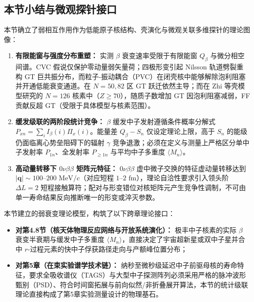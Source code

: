 \subsection{本节小结与微观探针接口}\label{sec:4-7-4}

本节确立了弱相互作用作为低能原子核结构、壳演化与微观关联多维探针的理论图像：
\begin{enumerate}
\item \textbf{有限能窗与强度分布重塑：} 实测 $\beta$ 衰变速率受限于有限能窗 $Q_\beta$ 与微分相空间谱。CVC 假说仅保护零动量弱矢量荷；四极形变引起 Nilsson 轨道劈裂重构 GT 巨共振分布，而粒子-振动耦合（PVC）在闭壳核中能够解除泡利阻塞并开通低能衰变通道。在 $N=50, 82$ 区 GT 跃迁依然主导；而在 Zhi 等壳模型研究的 $N=126$ 核素中（$Z \ge 70$），随质子数增加 GT 因泡利阻塞减弱，FF 贡献反超 GT（受限于具体模型与核素范围）。
\item \textbf{缓发级联的两阶段统计竞争：} $\beta$ 缓发中子发射遵循条件概率分解式 $P_{xn} = \sum_i I_\beta(i) \Pi_x(i)$。能量差 $Q_\beta - S_n$ 仅设定理论上限，高于 $S_n$ 的能级仍面临离心势垒阻碍下的辐射 $\gamma$ 竞争退激；必须在定义与测量上严格区分单中子发射率 $P_{1n}$、全发射率 $P_{\ge 1n}$ 与平均中子多重度 $\langle M_n \rangle$。
\item \textbf{高动量转移下 $0\nu\beta\beta$ 矩阵元特征：} $0\nu\beta\beta$ 虚中微子交换的特征虚动量转移达到 $|\mathbf{q}| \sim 100\text{--}200\text{ MeV}/c$（对应短程 $1\text{--}2\text{ fm}$），理论自洽性要求引入领头阶 $\Delta L = 2$ 短程接触算符；配对与形变错位对核矩阵元产生竞争性调制，不可由单一寿命结果反向推断唯一的形变或淬灭参数。
\end{enumerate}

本节建立的弱衰变理论模型，构筑了以下跨章理论接口：
\begin{itemize}
\item \textbf{对第4.8节（核天体物理反应网络与开放系统演化）：} 极丰中子核素的实际 $\beta$ 衰变半衰期与缓发中子多重度 $\langle M_n \rangle$，直接决定了宇宙超新星或双中子星并合中 $r$-过程元素的快中子俘获路径走向与产额峰位置分布；
\item \textbf{对第5章（在束实验谱学技术链）：} 纳秒至微秒级延迟中子前驱母核的寿命特征，要求全吸收谱仪（TAGS）与大型中子探测阵列必须采用严格的脉冲波形甄别（PSD）、符合时间窗拓展与前向似然/非折叠展开算法，本节的统计级联理论直接构成了第5章实验测量设计的物理基石。
\end{itemize}
